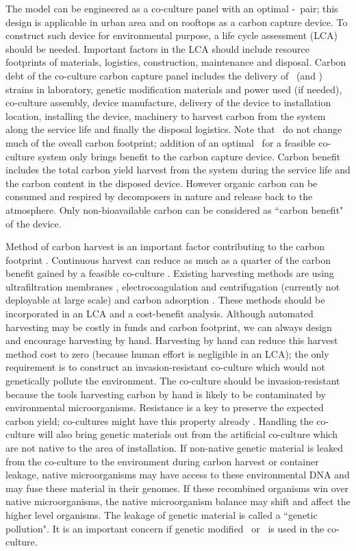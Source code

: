 \documentclass[../thesis.tex]{subfiles} %
\begin{document}
The model can be engineered as a co-culture panel with an optimal \phy-\bac\ pair; this design is applicable in urban area and on rooftops as a carbon capture device.  To construct such device for environmental purpose, a life cycle assessment (LCA) should be needed.  Important factors in the LCA should include resource footprints of materials, logistics, construction, maintenance and disposal.  Carbon debt of the co-culture carbon capture panel includes the delivery of \phy\ (and \bac) strains in laboratory, genetic modification materials and power used (if needed), co-culture assembly, device manufacture, delivery of the device to installation location, installing the device, machinery to harvest carbon from the system along the service life and finally the disposal logistics.  Note that \bac\ do not change much of the oveall carbon footprint; addition of an optimal \bac\ for a feasible co-culture system only brings benefit to the carbon capture device.  Carbon benefit includes the total carbon yield harvest from the system during the service life and the carbon content in the disposed device.  However organic carbon can be consumed and respired by decomposers in nature and release back to the atmosphere.  Only non-bioavailable carbon can be considered as ``carbon benefit" of the device.

Method of carbon harvest is an important factor contributing to the carbon footprint \autocite{fuentes2016impact}.  Continuous harvest can reduce as much as a quarter of the carbon benefit gained by a feasible co-culture \autocite{mata2010microalgae}.  Existing harvesting methods are using ultrafiltration membranes \autocite{zhang2010harvesting}, electrocoagulation and centrifugation (currently not deployable at large scale) \autocite{wijffels2010outlook} and carbon adsorption \autocite{mata2010microalgae,wang2012novel,lee2014repeated}.  These methods should be incorporated in an LCA and a cost-benefit analysis.  Although automated harvesting may be costly in funds and carbon footprint, we can always design and encourage harvesting by hand.  Harvesting by hand can reduce this harvest method cost to zero (because human effort is negligible in an LCA); the only requirement is to construct an invasion-resistant co-culture which would not genetically pollute the environment.  The co-culture should be invasion-resistant because the tools harvesting carbon by hand is likely to be contaminated by environmental microorganisms.  Resistance is a key to preserve the expected carbon yield; co-cultures might have this property already \autocite{fuentes2016impact,seyedsayamdost2011roseobacticides}.  Handling the co-culture will also bring genetic materials out from the artificial co-culture which are not native to the area of installation.  If non-native genetic material is leaked from the co-culture to the environment during carbon harvest or container leakage, native microorganisms may have access to these environmental DNA and may fuse these material in their genomes.  If these recombined organisms win over native microorganisms, the native microorganism balance may shift and affect the higher level organisms.  The leakage of genetic material is called a ``genetic pollution".  It is an important concern if genetic modified \phy\ or \bac\ is used in the co-culture.
\end{document}
